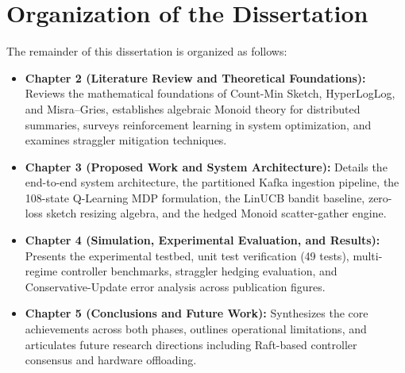 \section{Organization of the Dissertation}

The remainder of this dissertation is organized as follows:
\begin{itemize}
 \item \textbf{Chapter 2 (Literature Review and Theoretical Foundations):} Reviews the mathematical foundations of Count-Min Sketch, HyperLogLog, and Misra--Gries, establishes algebraic Monoid theory for distributed summaries, surveys reinforcement learning in system optimization, and examines straggler mitigation techniques.
 \item \textbf{Chapter 3 (Proposed Work and System Architecture):} Details the end-to-end system architecture, the partitioned Kafka ingestion pipeline, the 108-state Q-Learning MDP formulation, the LinUCB bandit baseline, zero-loss sketch resizing algebra, and the hedged Monoid scatter-gather engine.
 \item \textbf{Chapter 4 (Simulation, Experimental Evaluation, and Results):} Presents the experimental testbed, unit test verification (49 tests), multi-regime controller benchmarks, straggler hedging evaluation, and Conservative-Update error analysis across publication figures.
 \item \textbf{Chapter 5 (Conclusions and Future Work):} Synthesizes the core achievements across both phases, outlines operational limitations, and articulates future research directions including Raft-based controller consensus and hardware offloading.
\end{itemize}
